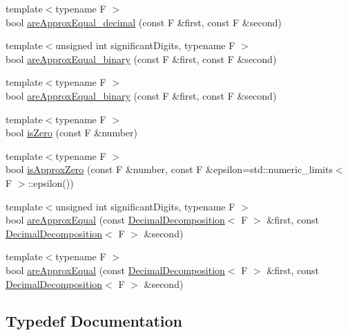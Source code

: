 \begin{DoxyCompactItemize}
{\footnotesize template$<$typename F $>$ }\\bool \hyperlink{namespaceMcCAD_1_1Tools_1_1FloatingPoint_a8a9a4b5a43aa618ccae5b0a4daba761c}{are\+Approx\+Equal\+\_\+decimal} (const F \&first, const F \&second)
\item 
{\footnotesize template$<$unsigned int significant\+Digits, typename F $>$ }\\bool \hyperlink{namespaceMcCAD_1_1Tools_1_1FloatingPoint_ac64303f6d68851f78cc80b6ffcec9202}{are\+Approx\+Equal\+\_\+binary} (const F \&first, const F \&second)
\item 
{\footnotesize template$<$typename F $>$ }\\bool \hyperlink{namespaceMcCAD_1_1Tools_1_1FloatingPoint_a3953b58a7f144facd5740b47b53d45a2}{are\+Approx\+Equal\+\_\+binary} (const F \&first, const F \&second)
\item 
{\footnotesize template$<$typename F $>$ }\\bool \hyperlink{namespaceMcCAD_1_1Tools_1_1FloatingPoint_a10fd15c76eb2901c2983aabad531d731}{is\+Zero} (const F \&number)
\item 
{\footnotesize template$<$typename F $>$ }\\bool \hyperlink{namespaceMcCAD_1_1Tools_1_1FloatingPoint_a92d14d494cb5fb205e46aad76a9a96b7}{is\+Approx\+Zero} (const F \&number, const F \&epsilon=std\+::numeric\+\_\+limits$<$ F $>$\+::epsilon())
\item 
{\footnotesize template$<$unsigned int significant\+Digits, typename F $>$ }\\bool \hyperlink{namespaceMcCAD_1_1Tools_1_1FloatingPoint_ad7e54b038b918c47fc8838d8dd57470a}{are\+Approx\+Equal} (const \hyperlink{classMcCAD_1_1Tools_1_1FloatingPoint_1_1DecimalDecomposition}{Decimal\+Decomposition}$<$ F $>$ \&first, const \hyperlink{classMcCAD_1_1Tools_1_1FloatingPoint_1_1DecimalDecomposition}{Decimal\+Decomposition}$<$ F $>$ \&second)
\item 
{\footnotesize template$<$typename F $>$ }\\bool \hyperlink{namespaceMcCAD_1_1Tools_1_1FloatingPoint_aa68a5da68caedadf1e341ecd48ac65f6}{are\+Approx\+Equal} (const \hyperlink{classMcCAD_1_1Tools_1_1FloatingPoint_1_1DecimalDecomposition}{Decimal\+Decomposition}$<$ F $>$ \&first, const \hyperlink{classMcCAD_1_1Tools_1_1FloatingPoint_1_1DecimalDecomposition}{Decimal\+Decomposition}$<$ F $>$ \&second)
\end{DoxyCompactItemize}


\subsection{Typedef Documentation}
\mbox{\label{namespaceMcCAD_1_1Tools_1_1FloatingPoint_ad668f5149777d636ded664cb5e7e2940}} 

